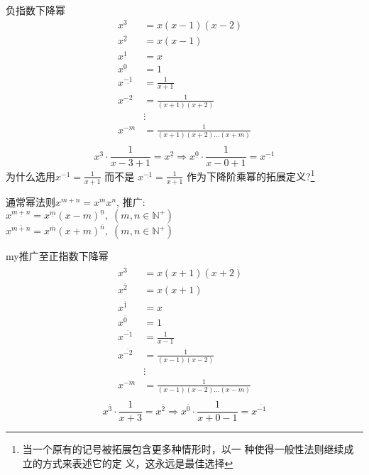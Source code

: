 \documentclass[mode=geye, chinesefont=founder]{elegantnote}
\newcommand{\fallingfactorial}[1]{%
  ^{\underline{#1}}%
}
\newcommand{\risingfactorial}[1]{%
  ^{\overline{#1}}%
}
\begin{document}
负指数下降幂
\begin{align*}
    x\fallingfactorial{3}  &= x(x-1)(x-2) \\
    x\fallingfactorial{2}  &= x(x-1) \\
    x\fallingfactorial{1}  &= x \\
    x\fallingfactorial{0}  &= 1 \\
    x\fallingfactorial{-1} &= \frac{1}{x+1} \\
    x\fallingfactorial{-2} &= \frac{1}{(x+1)(x+2)} \\
    &\vdots \\
    x\fallingfactorial{-m} &= \frac{1}{(x+1)(x+2)\dots(x+m)} \\
\end{align*}
\begin{equation*}
    x\fallingfactorial{3}\cdot \frac{1}{x-3+1} = x\fallingfactorial{2} \Rightarrow 
    x\fallingfactorial{0}\cdot \frac{1}{x-0+1} = x\fallingfactorial{-1}
\end{equation*}
为什么选用$ x\fallingfactorial{-1}=\frac{1}{x+1} $ 
而不是 $ x\fallingfactorial{-1}=\frac{1}{x+1} $ 作为下降阶乘幂的拓展定义?\footnote{当一个原有的记号被拓展包含更多种情形时，以一
种使得一般性法则继续成立的方式来表述它的定
义，这永远是最佳选择}

通常幂法则$ x^{m+n}=x^m x^n $, 
推广:\\
{\color{red}$ x\fallingfactorial{m+n} = x\fallingfactorial{m}(x-m)\fallingfactorial{n},\;(m,n\in\mathbb{N}^+) $ }\\
{\color{red}$ x\risingfactorial{m+n} = x\risingfactorial{m}(x+m)\risingfactorial{n},\;(m,n\in\mathbb{N}^+) $ }

{my}推广至正指数下降幂
\begin{align*}
    x\risingfactorial{3}  &= x(x+1)(x+2) \\
    x\risingfactorial{2}  &= x(x+1) \\
    x\risingfactorial{1}  &= x \\
    x\risingfactorial{0}  &= 1 \\
    x\risingfactorial{-1} &= \frac{1}{x-1} \\
    x\risingfactorial{-2} &= \frac{1}{(x-1)(x-2)} \\
    &\vdots \\
    x\risingfactorial{-m} &= \frac{1}{(x-1)(x-2)\dots(x-m)} \\
\end{align*}
\begin{equation*}
    x\risingfactorial{3}\cdot \frac{1}{x+3} = x\risingfactorial{2} \Rightarrow 
    x\risingfactorial{0}\cdot \frac{1}{x+0-1} = x\risingfactorial{-1}
\end{equation*}
\end{document}
